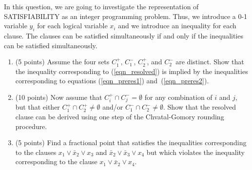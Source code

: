 \documentclass[12pt]{article}
\begin{document}
\begin{enumerate}
In this question, we are going to investigate the representation of
SATISFIABILITY as an integer programming problem.
Thus, we introduce a 0-1 variable $y_i$ for each logical variable $x_i$
and we introduce an inequality for each clause.
The clauses can be satisfied simultaneously if and only if the
inequalities can be satisfied simultaneously.

\begin{enumerate}
\item (5 points)
Assume the four sets $C_1^+$, $C_1^-$, $C_2^+$, and $C_2^-$ are distinct.
Show that the inequality corresponding to (\ref{eqn_resolved})
is implied by the inequalities corresponding to equations (\ref{eqn_preres1})
and~(\ref{eqn_preres2}).
\item (10 points)
Now assume that $C_i^+ \cap C_j^- = \emptyset$
for any combination of $i$ and $j$,
but that either $C_1^+ \cap C_2^+ \neq \emptyset$
and/or $C_1^- \cap C_2^- \neq \emptyset$.
Show that the resolved clause can be derived using one step of the
Chvatal-Gomory rounding procedure.
\item (5 points)
Find a fractional point that satisfies the inequalities corresponding
to the clauses
$x_1 \vee \bar{x}_2 \vee x_3$
and $\bar{x}_2 \vee \bar{x}_3 \vee x_4$
but which violates the inequality corresponding to
the clause $x_1 \vee \bar{x}_2 \vee x_4$.
\end{enumerate}
  \newpage
  \setcounter{page}{5}  \quad  \vspace*{\fill}   \quad
  \newpage
  \setcounter{page}{5}  \quad  \vspace*{\fill}   \quad
\end{enumerate}
\end{document}
